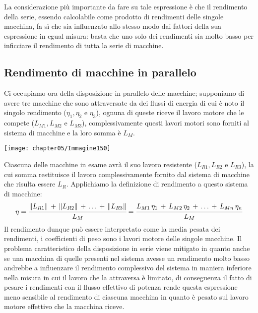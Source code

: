 La considerazione più importante da fare su tale espressione è che il rendimento della serie, essendo calcolabile come prodotto di rendimenti delle singole macchina, fa sì che sia influenzato allo stesso modo dai fattori della sua espressione in egual misura: basta che uno solo dei rendimenti sia molto basso per inficciare il rendimento di tutta la serie di macchine.

\subsection{Rendimento di macchine in parallelo}

\begin{minipage}{.5\textwidth}
Ci occupiamo ora della disposizione in parallelo delle macchine; supponiamo di avere tre macchine che sono attraversate da dei flussi di energia di cui è noto il singolo rendimento ($\eta_1, \eta_2$ e $\eta_3$), ognuna di queste riceve il lavoro motore che le compete ($L_{M1}, L_{M2}$ e $L_{M3}$), complessivamente questi lavori motori sono forniti al sistema di macchine e la loro somma è $L_M$.
\end{minipage}
\hfill
\begin{minipage}{.5\textwidth}
\centering
\texttt{[image: chapter05/Immagine150]}
\end{minipage}
\vspace{1mm}

Ciascuna delle macchine in esame avrà il suo lavoro resistente ($L_{R1}, L_{R2}$ e $L_{R3}$), la cui somma restituisce il lavoro complessivamente fornito dal sistema di macchine che risulta essere $L_R$. Applichiamo la definizione di rendimento a questo sistema di macchine:
\[\eta = \cfrac{\lVert L_{R1}\rVert\,+\,\lVert L_{R2}\rVert\,+\,\dots\,+\,\lVert L_{R3}\rVert}{L_M} = \cfrac{L_{M1}\,\eta_1\,+\,L_{M2}\,\eta_2\,+\,\dots\,+\,L_{Mn}\,\eta_n}{L_M}\]
Il rendimento dunque può essere interpretato come la media pesata dei rendimenti, i coefficienti di peso sono i lavori motore delle singole macchine. Il problema caratteristico della disposizione in serie viene mitigato in quanto anche se una macchina di quelle presenti nel sistema avesse un rendimento molto basso andrebbe a influenzare il rendimento complessivo del sistema in maniera inferiore nella misura in cui il lavoro che la attraversa è limitato, di conseguenza il fatto di pesare i rendimenti con il flusso effettivo di potenza rende questa espressione meno sensibile al rendimento di ciascuna macchina in quanto è pesato sul lavoro motore effettivo che la macchina riceve.

